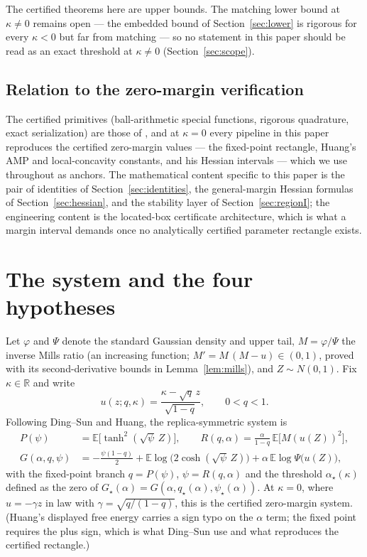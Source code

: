 \documentclass[11pt]{article}
\theoremstyle{remark}
\newcommand{\E}{\mathbb{E}}
\newcommand{\R}{\mathbb{R}}
\begin{document}
The certified theorems here are upper bounds.  The matching lower
bound at $\kappa\ne0$ remains open --- the embedded bound of
Section~\ref{sec:lower} is rigorous for every $\kappa<0$ but far
from matching --- so no statement in this paper
should be read as an exact threshold at $\kappa\ne0$
(Section~\ref{sec:scope}).

\subsection*{Relation to the zero-margin verification}

The certified primitives (ball-arithmetic special functions, rigorous
quadrature, exact serialization) are those of
\cite{shmalo2026capacity}, and at $\kappa=0$ every pipeline in this
paper reproduces the certified zero-margin values --- the fixed-point
rectangle, Huang's AMP and local-concavity constants, and his
Hessian intervals --- which we use throughout as anchors.  The
mathematical content specific to this paper is the pair of identities
of Section~\ref{sec:identities}, the general-margin Hessian formulas
of Section~\ref{sec:hessian}, and the stability layer of
Section~\ref{sec:regionI}; the engineering content is the located-box
certificate architecture, which is what a margin interval demands
once no analytically certified parameter rectangle exists.

\section{The system and the four hypotheses}\label{sec:system}

Let $\varphi$ and $\Psi$ denote the standard Gaussian density and
upper tail, $M=\varphi/\Psi$ the inverse Mills ratio (an increasing
function; $M'=M\,(M-u)\in(0,1)$, proved with its second-derivative
bounds in Lemma~\ref{lem:mills}), and $Z\sim N(0,1)$.  Fix
$\kappa\in\R$ and write
\[
u(z;q,\kappa)=\frac{\kappa-\sqrt{q}\,z}{\sqrt{1-q}},\qquad 0<q<1 .
\]
Following Ding--Sun and Huang, the replica-symmetric system is
\begin{align}
P(\psi)&=\E\bigl[\tanh^2(\sqrt{\psi}\,Z)\bigr],\qquad
R(q,\alpha)=\frac{\alpha}{1-q}\,\E\bigl[M(u(Z))^2\bigr],
\label{eq:PR}\\
G(\alpha,q,\psi)&=-\frac{\psi(1-q)}{2}
+\E\log\bigl(2\cosh(\sqrt{\psi}\,Z)\bigr)
+\alpha\,\E\log\Psi\bigl(u(Z)\bigr),
\label{eq:G}
\end{align}
with the fixed-point branch $q=P(\psi)$, $\psi=R(q,\alpha)$ and the
threshold $\alpha_\star(\kappa)$ defined as the zero of
$G_\star(\alpha)=G(\alpha,q_\star(\alpha),\psi_\star(\alpha))$.  At
$\kappa=0$, where $u=-\gamma z$ in law with $\gamma=\sqrt{q/(1-q)}$,
this is the certified zero-margin system.  (Huang's displayed
free energy carries a sign typo on the $\alpha$ term; the fixed point
requires the plus sign, which is what Ding--Sun use and what
reproduces the certified rectangle.)
\end{document}
